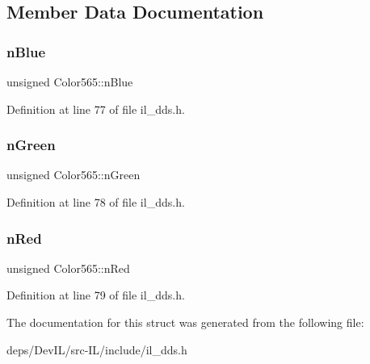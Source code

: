 \subsection{Member Data Documentation}
\mbox{\label{structColor565_ab161b8bbeebeef7dae129499626dcca4}} 
\subsubsection{\texorpdfstring{n\+Blue}{nBlue}}
{\footnotesize\ttfamily unsigned Color565\+::n\+Blue}



Definition at line 77 of file il\+\_\+dds.\+h.

\mbox{\label{structColor565_a4bd24cf368bfb9afcc34be9b7ced3d9f}} 
\subsubsection{\texorpdfstring{n\+Green}{nGreen}}
{\footnotesize\ttfamily unsigned Color565\+::n\+Green}



Definition at line 78 of file il\+\_\+dds.\+h.

\mbox{\label{structColor565_a1e8a07060938b9528e1b7d61966128e3}} 
\subsubsection{\texorpdfstring{n\+Red}{nRed}}
{\footnotesize\ttfamily unsigned Color565\+::n\+Red}



Definition at line 79 of file il\+\_\+dds.\+h.



The documentation for this struct was generated from the following file\+:\begin{DoxyCompactItemize}
\item 
deps/\+Dev\+I\+L/src-\/\+I\+L/include/il\+\_\+dds.\+h\end{DoxyCompactItemize}
